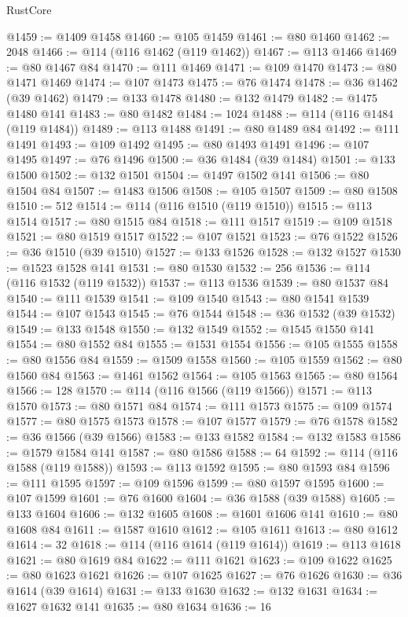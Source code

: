 \begin{lexlean}{RustCore}
\begin{coremodule}
@1459 := @1409 @1458
@1460 := @105 @1459
@1461 := @80 @1460
@1462 := 2048
@1466 := @114 (@116 @1462 (@119 @1462))
@1467 := @113 @1466
@1469 := @80 @1467 @84
@1470 := @111 @1469
@1471 := @109 @1470
@1473 := @80 @1471 @1469
@1474 := @107 @1473
@1475 := @76 @1474
@1478 := @36 @1462 (@39 @1462)
@1479 := @133 @1478
@1480 := @132 @1479
@1482 := @1475 @1480 @141
@1483 := @80 @1482
@1484 := 1024
@1488 := @114 (@116 @1484 (@119 @1484))
@1489 := @113 @1488
@1491 := @80 @1489 @84
@1492 := @111 @1491
@1493 := @109 @1492
@1495 := @80 @1493 @1491
@1496 := @107 @1495
@1497 := @76 @1496
@1500 := @36 @1484 (@39 @1484)
@1501 := @133 @1500
@1502 := @132 @1501
@1504 := @1497 @1502 @141
@1506 := @80 @1504 @84
@1507 := @1483 @1506
@1508 := @105 @1507
@1509 := @80 @1508
@1510 := 512
@1514 := @114 (@116 @1510 (@119 @1510))
@1515 := @113 @1514
@1517 := @80 @1515 @84
@1518 := @111 @1517
@1519 := @109 @1518
@1521 := @80 @1519 @1517
@1522 := @107 @1521
@1523 := @76 @1522
@1526 := @36 @1510 (@39 @1510)
@1527 := @133 @1526
@1528 := @132 @1527
@1530 := @1523 @1528 @141
@1531 := @80 @1530
@1532 := 256
@1536 := @114 (@116 @1532 (@119 @1532))
@1537 := @113 @1536
@1539 := @80 @1537 @84
@1540 := @111 @1539
@1541 := @109 @1540
@1543 := @80 @1541 @1539
@1544 := @107 @1543
@1545 := @76 @1544
@1548 := @36 @1532 (@39 @1532)
@1549 := @133 @1548
@1550 := @132 @1549
@1552 := @1545 @1550 @141
@1554 := @80 @1552 @84
@1555 := @1531 @1554
@1556 := @105 @1555
@1558 := @80 @1556 @84
@1559 := @1509 @1558
@1560 := @105 @1559
@1562 := @80 @1560 @84
@1563 := @1461 @1562
@1564 := @105 @1563
@1565 := @80 @1564
@1566 := 128
@1570 := @114 (@116 @1566 (@119 @1566))
@1571 := @113 @1570
@1573 := @80 @1571 @84
@1574 := @111 @1573
@1575 := @109 @1574
@1577 := @80 @1575 @1573
@1578 := @107 @1577
@1579 := @76 @1578
@1582 := @36 @1566 (@39 @1566)
@1583 := @133 @1582
@1584 := @132 @1583
@1586 := @1579 @1584 @141
@1587 := @80 @1586
@1588 := 64
@1592 := @114 (@116 @1588 (@119 @1588))
@1593 := @113 @1592
@1595 := @80 @1593 @84
@1596 := @111 @1595
@1597 := @109 @1596
@1599 := @80 @1597 @1595
@1600 := @107 @1599
@1601 := @76 @1600
@1604 := @36 @1588 (@39 @1588)
@1605 := @133 @1604
@1606 := @132 @1605
@1608 := @1601 @1606 @141
@1610 := @80 @1608 @84
@1611 := @1587 @1610
@1612 := @105 @1611
@1613 := @80 @1612
@1614 := 32
@1618 := @114 (@116 @1614 (@119 @1614))
@1619 := @113 @1618
@1621 := @80 @1619 @84
@1622 := @111 @1621
@1623 := @109 @1622
@1625 := @80 @1623 @1621
@1626 := @107 @1625
@1627 := @76 @1626
@1630 := @36 @1614 (@39 @1614)
@1631 := @133 @1630
@1632 := @132 @1631
@1634 := @1627 @1632 @141
@1635 := @80 @1634
@1636 := 16

\end{coremodule}
\end{lexlean}

